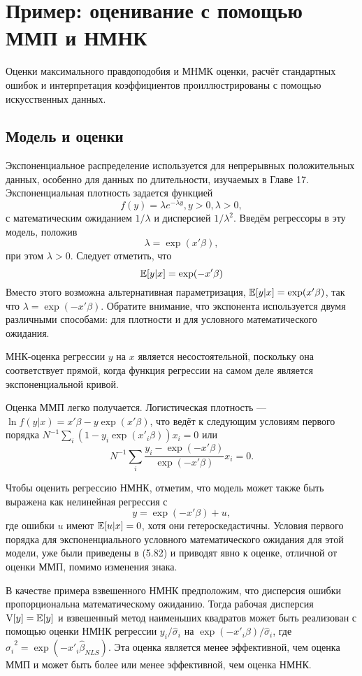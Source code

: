 \section{Пример: оценивание с помощью ММП и НМНК}

Оценки максимального правдоподобия и МНМК оценки, расчёт стандартных ошибок и интерпретация коэффициентов проиллюстрированы с помощью искусственных данных.

\subsection{Модель и оценки}
 
Экспоненциальное распределение используется для непрерывных положительных данных, особенно для данных по длительности, изучаемых в Главе 17. Экспоненциальная плотность задается функцией
\[
f(y)=\lambda e^{-\lambda y}, y>0, \lambda>0,
\]
с математическим ожиданием $1/\lambda$ и дисперсией $1/\lambda^2$. Введём регрессоры в эту модель, положив
\[
\lambda=\exp(x'\beta),
\]
при этом $\lambda>0$. Следует отметить, что
\[
\mathbb{E}[y|x]=\exp(-x'\beta)
\]
Вместо этого возможна альтернативная параметризация, $\mathbb{E}[y|x]=\exp(x'\beta)$, так что $\lambda=\exp(-x'\beta)$. Обратите внимание, что экспонента используется двумя различными способами: для плотности и для условного математического ожидания.

МНК-оценка регрессии $y$ на $x$ является несостоятельной, поскольку она соответствует прямой, когда функция регрессии на самом деле является экспоненциальной кривой.

Оценка ММП легко получается. Логистическая плотность --- $\ln f(y|x)=x'\beta-y\exp(x'\beta)$, что ведёт к следующим условиям первого порядка $N^{-1}\sum_i (1-y_{i}\exp(x'_i\beta))x_i=0$ или
\[
N^{-1}\sum_i \frac {y_{i}-\exp(-x'\beta)}{\exp(-x'\beta)}x_i=0.
\]

Чтобы оценить регрессию НМНК, отметим, что модель может также быть выражена как нелинейная регрессия с
\[
y=\exp(-x'\beta)+u,
\]
где ошибки $u$ имеют $\mathbb{E}[u|x]=0$, хотя они гетероскедастичны. Условия первого порядка для экспоненциального условного математического ожидания для этой модели, уже были приведены в (5.82) и приводят явно к оценке, отличной от оценки ММП, помимо изменения знака.

В качестве примера взвешенного НМНК предположим, что дисперсия ошибки пропорциональна  математическому ожиданию. Тогда рабочая дисперсия $\mathrm{V}[y]=\mathbb{E}[y]$ и взвешенный метод наименьших квадратов может быть реализован с помощью оценки НМНК регрессии $y_{i}/\hat{\sigma}_i$ на $\exp(-x'_{i}\beta)/\hat{\sigma}_i$, где ${\hat{\sigma}_i}^2=\exp(-x'_{i}\hat{\beta}_{NLS})$. Эта оценка является менее эффективной, чем оценка ММП и может  быть более или менее эффективной, чем оценка НМНК.

